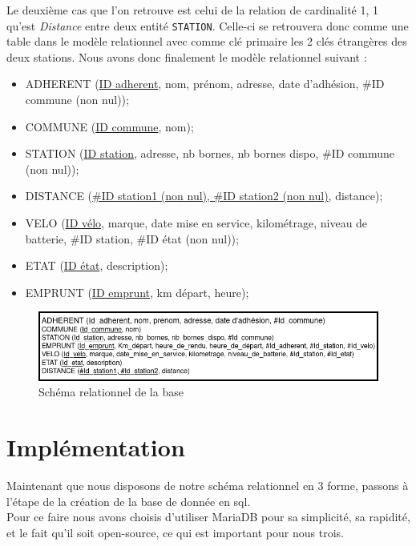 \documentclass[10pt]{article}
\begin{document}
  Le deuxième cas que l'on retrouve est celui de la relation de cardinalité 1, 1 qu'est \textit{Distance} entre deux entité \texttt{STATION}.
  Celle-ci se retrouvera donc comme une table dans le modèle relationnel avec comme clé primaire les 2 clés étrangères des
  deux stations.
  Nous avons donc finalement le modèle relationnel suivant :\\
  \begin{itemize}
    \item ADHERENT (\underline{ID adherent}, nom, prénom, adresse, date d'adhésion, \#ID commune (non nul));
    \item COMMUNE (\underline{ID commune}, nom);
    \item STATION (\underline{ID station}, adresse, nb bornes, nb bornes dispo, \#ID commune (non nul));
    \item DISTANCE (\underline{\#ID station1 (non nul), \#ID station2 (non nul)}, distance);
    \item VELO (\underline{ID vélo}, marque, date mise en service, kilométrage, niveau de batterie, \#ID station, \#ID état (non nul));
    \item ETAT (\underline{ID état}, description);
    \item EMPRUNT (\underline{ID emprunt}, km départ, heure);
  \end{itemize}
  \begin{figure}[!h]
    \centering
    \includegraphics[scale=0.5]{img/schema_relationel}
    \caption{Schéma relationnel de la base}
    \label{fig:relat}
  \end{figure}

  \section{Implémentation}\label{sec:implementation}
  Maintenant que nous disposons de notre schéma relationnel en 3\ieme{} forme, passons à l'étape de la création de la base de donnée en sql.\\
  Pour ce faire nous avons choisis d'utiliser MariaDB pour sa simplicité, sa rapidité, et le fait qu'il soit open-source, ce qui est important pour nous trois.\\
  
\end{document}
